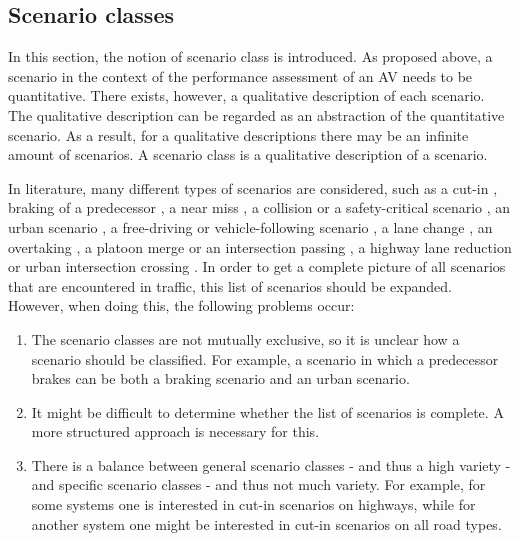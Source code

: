 \subsection{Scenario classes}
In this section, the notion of scenario class is introduced. As proposed above, a scenario in the context of the performance assessment of an AV needs to be quantitative. There exists, however, a qualitative description of each scenario. The qualitative description can be regarded as an abstraction of the quantitative scenario. As a result, for a qualitative descriptions there may be an infinite amount of scenarios. A scenario class is a qualitative description of a scenario. 

In literature, many different types of scenarios are considered, such as a cut-in \cite{xu2002effects, gietelink2006development,roesener2017comprehensive}, braking of a predecessor \cite{xu2002effects,deGelder2017assessment,hulshof2013autonomous}, a near miss \cite{gietelink2006development}, a collision or a safety-critical scenario \cite{gietelink2006development,ebner2011identifying}, an urban scenario \cite{zofka2015datadrivetrafficscenarios}, a free-driving or vehicle-following scenario \cite{roesener2017comprehensive}, a lane change \cite{roesener2017comprehensive}, an overtaking \cite{karaduman2013interactivebehavior}, a platoon merge or an intersection passing \cite{englund2016grand}, a highway lane reduction or urban intersection crossing \cite{ploeg2017GCDC}. In order to get a complete picture of all scenarios that are encountered in traffic, this list of scenarios should be expanded. However, when doing this, the following problems occur:

\begin{enumerate}
	\item The scenario classes are not mutually exclusive, so it is unclear how a scenario should be classified. For example, a scenario in which a predecessor brakes can be both a braking scenario and an urban scenario. \label{item:mutual exclusiveness}
	\item It might be difficult to determine whether the list of scenarios is complete. A more structured approach is necessary for this. \label{item:completeness}
	\item There is a balance between general scenario classes - and thus a high variety - and specific scenario classes - and thus not much variety. For example, for some systems one is interested in cut-in scenarios on highways, while for another system one might be interested in cut-in scenarios on all road types. \label{item:generality}
\end{enumerate}


